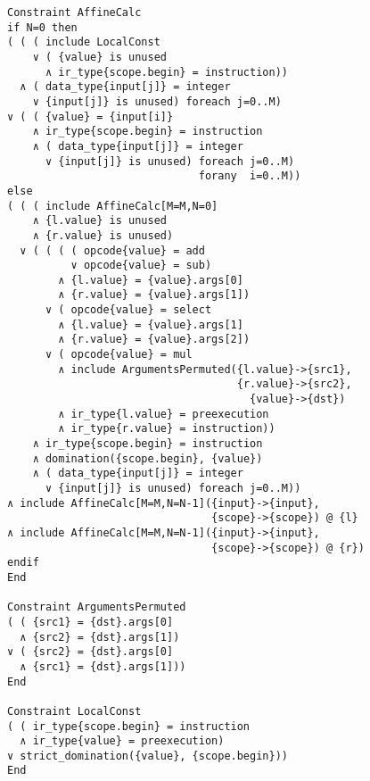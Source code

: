 \begin{figure}[p]
\begin{lstlisting}[language=CAnDL, firstnumber=142]
Constraint AffineCalc
if N=0 then
( ( ( include LocalConst
    ∨ ( {value} is unused
      ∧ ir_type{scope.begin} = instruction))
  ∧ ( data_type{input[j]} = integer
    ∨ {input[j]} is unused) foreach j=0..M)
∨ ( ( {value} = {input[i]}
    ∧ ir_type{scope.begin} = instruction
    ∧ ( data_type{input[j]} = integer
      ∨ {input[j]} is unused) foreach j=0..M)
                              forany  i=0..M))
else
( ( ( include AffineCalc[M=M,N=0]
    ∧ {l.value} is unused
    ∧ {r.value} is unused)
  ∨ ( ( ( ( opcode{value} = add
          ∨ opcode{value} = sub)
        ∧ {l.value} = {value}.args[0]
        ∧ {r.value} = {value}.args[1])
      ∨ ( opcode{value} = select
        ∧ {l.value} = {value}.args[1]
        ∧ {r.value} = {value}.args[2])
      ∨ ( opcode{value} = mul
        ∧ include ArgumentsPermuted({l.value}->{src1},
                                    {r.value}->{src2},
                                      {value}->{dst})
        ∧ ir_type{l.value} = preexecution
        ∧ ir_type{r.value} = instruction))
    ∧ ir_type{scope.begin} = instruction
    ∧ domination({scope.begin}, {value})
    ∧ ( data_type{input[j]} = integer
      ∨ {input[j]} is unused) foreach j=0..M))
∧ include AffineCalc[M=M,N=N-1]({input}->{input},
                                {scope}->{scope}) @ {l}
∧ include AffineCalc[M=M,N=N-1]({input}->{input},
                                {scope}->{scope}) @ {r})
endif
End

Constraint ArgumentsPermuted
( ( {src1} = {dst}.args[0]
  ∧ {src2} = {dst}.args[1])
∨ ( {src2} = {dst}.args[0]
  ∧ {src1} = {dst}.args[1]))
End

Constraint LocalConst
( ( ir_type{scope.begin} = instruction
  ∧ ir_type{value} = preexecution)
∨ strict_domination({value}, {scope.begin}))
End
\end{lstlisting}
\end{figure}
